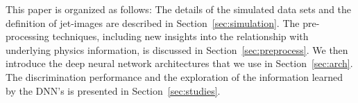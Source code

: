 \documentclass{article}
\begin{document}


This paper is organized as follows:  The details of the simulated data sets and the definition of jet-images are described in Section~\ref{sec:simulation}.    The pre-processing techniques, including new insights into the relationship with underlying physics information, is discussed in Section~\ref{sec:preprocess}.  We then introduce the deep neural network architectures that we use in Section~\ref{sec:arch}.  The discrimination performance and the exploration of the information learned by the DNN's is presented in Section~\ref{sec:studies}.

\end{document}
